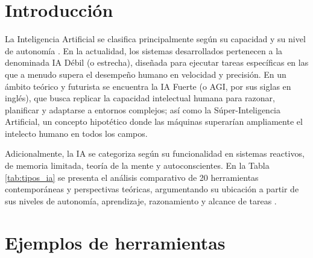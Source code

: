 \documentclass[11pt,letterpaper]{article}
\begin{document}
\portada
\indicegeneral


\section{Introducción}

La Inteligencia Artificial se clasifica principalmente según su capacidad y su nivel de autonomía \parencite{iae_u1_diseno}. En la actualidad, los sistemas desarrollados pertenecen a la denominada IA Débil (o estrecha), diseñada para ejecutar tareas específicas en las que a menudo supera el desempeño humano en velocidad y precisión. En un ámbito teórico y futurista se encuentra la IA Fuerte (o AGI, por sus siglas en inglés), que busca replicar la capacidad intelectual humana para razonar, planificar y adaptarse a entornos complejos; así como la Súper-Inteligencia Artificial, un concepto hipotético donde las máquinas superarían ampliamente el intelecto humano en todos los campos.

Adicionalmente, la IA se categoriza según su funcionalidad \parencite{iae_u1_diseno} en sistemas reactivos, de memoria limitada, teoría de la mente y autoconscientes. En la Tabla \ref{tab:tipos_ia} se presenta el análisis comparativo de 20 herramientas contemporáneas y perspectivas teóricas, argumentando su ubicación a partir de sus niveles de autonomía, aprendizaje, razonamiento y alcance de tareas \parencite{iae_u1_cuaderno}.


\section{Ejemplos de herramientas}
\end{document}

